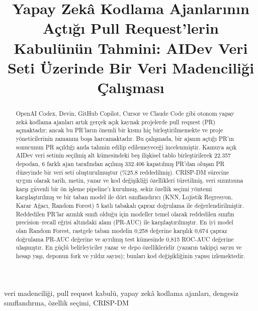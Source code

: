 \documentclass[conference]{IEEEtran}
\begin{document}
\sloppy

\title{Yapay Zekâ Kodlama Ajanlarının Açtığı Pull Request'lerin Kabulünün Tahmini: AIDev Veri Seti Üzerinde Bir Veri Madenciliği Çalışması}

\author{
}

\maketitle

\begin{abstract}
OpenAI Codex, Devin, GitHub Copilot, Cursor ve Claude Code gibi otonom yapay zekâ kodlama ajanları artık gerçek açık kaynak projelerde pull request (PR) açmaktadır; ancak bu PR'ların önemli bir kısmı hiç birleştirilmemekte ve proje yöneticilerinin zamanını boşa harcamaktadır. Bu çalışmada, bir ajanın açtığı PR'ın sonucunun PR açıldığı anda tahmin edilip edilemeyeceği incelenmiştir. Kamuya açık AIDev veri setinin seçilmiş alt kümesindeki beş ilişkisel tablo birleştirilerek 22.357 depodan, 6 farklı ajan tarafından açılmış 332.406 kapatılmış PR'dan oluşan PR düzeyinde bir veri seti oluşturulmuştur (\%25,8 reddedilmiş). CRISP-DM sürecine uygun olarak tarih, metin, yazar ve kod değişikliği özellikleri türetilmiş, veri sızıntısına karşı güvenli bir ön işleme pipeline'ı kurulmuş, sekiz özellik seçimi yöntemi karşılaştırılmış ve bir taban model ile dört sınıflandırıcı (KNN, Lojistik Regresyon, Karar Ağacı, Random Forest) 5 katlı tabakalı çapraz doğrulama ile değerlendirilmiştir. Reddedilen PR'lar azınlık sınıfı olduğu için modeller temel olarak reddedilen sınıfın precision--recall eğrisi altındaki alanı (PR-AUC) ile karşılaştırılmıştır. En iyi model olan Random Forest, rastgele taban modelin 0,258 değerine karşılık 0,674 çapraz doğrulama PR-AUC değerine ve ayrılmış test kümesinde 0,815 ROC-AUC değerine ulaşmıştır. En güçlü belirleyiciler yazar ve depo özellikleridir (yazarın takipçi sayısı ve hesap yaşı, deponun fork ve yıldız sayısı); bunları kod değişikliğinin yapısı izlemektedir.
\end{abstract}

\begin{IEEEkeywords}
veri madenciliği, pull request kabulü, yapay zekâ kodlama ajanları, dengesiz sınıflandırma, özellik seçimi, CRISP-DM
\end{IEEEkeywords}
\end{document}
